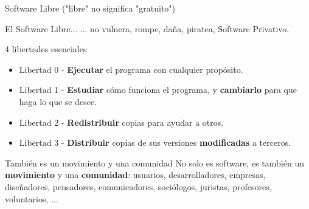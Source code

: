 \documentclass[spanish]{beamer}
\begin{document}
\begin{frame}{Software Libre ("libre" no significa "gratuito")}
    \begin{alertblock}{El Software Libre...}
        ... no vulnera, rompe, daña, piratea, Software Privativo.
    \end{alertblock}
    \begin{block}{4 libertades esenciales}
        \begin{itemize}
            \item Libertad 0 - \textbf{Ejecutar} el programa con cualquier propósito.
            \item Libertad 1 - \textbf{Estudiar} cómo funciona el programa, y \textbf{cambiarlo} para que haga lo que se desee.
            \item Libertad 2 - \textbf{Redistribuir} copias para ayudar a otros.
            \item Libertad 3 - \textbf{Distribuir} copias de sus versiones \textbf{modificadas} a terceros.
        \end{itemize}

    \end{block}

    \begin{alertblock}{También es un movimiento y una comunidad}
        No solo es software, es también un \textbf{movimiento} y una \textbf{comunidad}: usuarios, desarrolladores, empresas, diseñadores, pensadores, comunicadores, sociólogos, juristas, profesores, voluntarios, ...
    \end{alertblock}
\end{frame}
\end{document}
